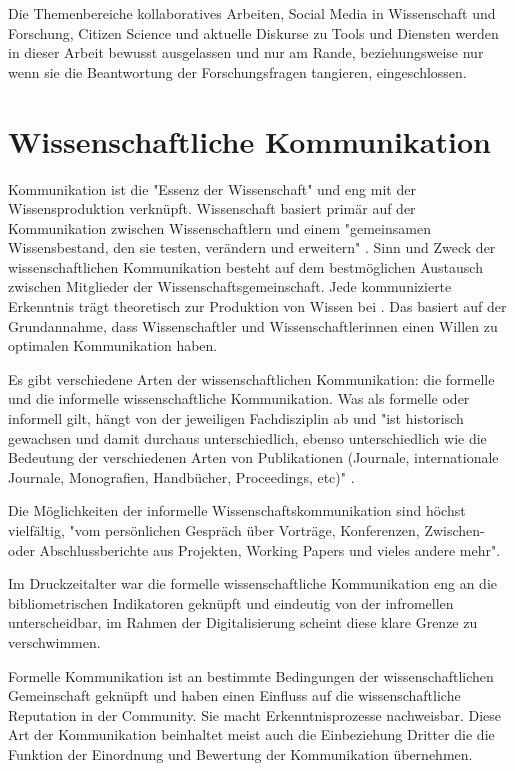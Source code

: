 Die Themenbereiche kollaboratives Arbeiten, Social Media in Wissenschaft und Forschung, Citizen Science und aktuelle Diskurse zu Tools und Diensten werden in dieser Arbeit bewusst ausgelassen und nur am Rande, beziehungsweise nur wenn sie die Beantwortung der Forschungsfragen tangieren, eingeschlossen.

\section{Wissenschaftliche Kommunikation}

Kommunikation ist die "Essenz der Wissenschaft" \cite{garvey_2014_communication} und eng mit der Wissensproduktion verknüpft. Wissenschaft basiert primär auf der Kommunikation zwischen Wissenschaftlern und einem "gemeinsamen Wissensbestand, den sie testen, verändern und erweitern" \cite{Gl_ser_2007}. Sinn und Zweck der wissenschaftlichen Kommunikation besteht auf dem bestmöglichen Austausch zwischen Mitglieder der Wissenschaftsgemeinschaft. Jede kommunizierte Erkenntnis trägt theoretisch zur Produktion von Wissen bei \cite{kaden_2009_library}. Das basiert auf der Grundannahme, dass Wissenschaftler und Wissenschaftlerinnen einen Willen zu optimalen Kommunikation haben. 

Es gibt verschiedene Arten der wissenschaftlichen Kommunikation: die formelle und die informelle wissenschaftliche Kommunikation. Was als formelle oder informell gilt, hängt von der jeweiligen Fachdisziplin ab und "ist historisch gewachsen und damit durchaus unterschiedlich, ebenso unterschiedlich wie die Bedeutung der verschiedenen Arten von Publikationen (Journale, internationale Journale, Monografien, Handbücher, Proceedings, etc)" \cite{Hanekop_2014}. 

Die Möglichkeiten der informelle Wissenschaftskommunikation sind höchst vielfältig, "vom persönlichen Gespräch über Vorträge, Konferenzen, Zwischen- oder Abschlussberichte aus Projekten, Working Papers und vieles andere mehr"\cite{Hanekop_2014}. 

Im Druckzeitalter war die formelle wissenschaftliche Kommunikation eng an die bibliometrischen Indikatoren geknüpft und eindeutig von der infromellen unterscheidbar, im Rahmen der Digitalisierung scheint diese klare Grenze zu verschwimmen.

Formelle Kommunikation ist an bestimmte Bedingungen der wissenschaftlichen Gemeinschaft geknüpft und haben einen Einfluss auf die wissenschaftliche Reputation in der Community. Sie macht Erkenntnisprozesse nachweisbar\cite{kaden_2009_library}. Diese Art der Kommunikation beinhaltet meist auch die Einbeziehung Dritter die die Funktion der Einordnung und Bewertung der Kommunikation übernehmen.

